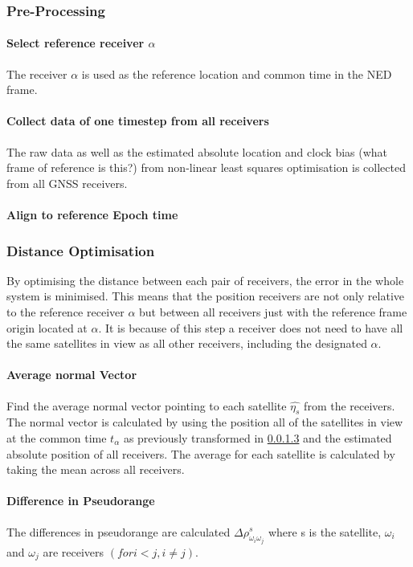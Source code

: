 \subsubsection{Pre-Processing}
\paragraph{Select reference receiver $\alpha$}
The receiver $\alpha$ is used as the reference location and common time in the NED frame. 
\paragraph{Collect data of one timestep from all receivers}
The raw data as well as the estimated absolute location and clock bias (what frame of reference is this?) from non-linear least squares optimisation is collected from all GNSS receivers.
\paragraph{Align to reference Epoch time}\label{timetransform}


\subsubsection{Distance Optimisation}
By optimising the distance between each pair of receivers, the error in the whole system is minimised. 
This means that the position receivers are not only relative to the reference receiver $\alpha$ but between all receivers just with the reference frame origin located at $\alpha$. It is because of this step a receiver does not need to have all the same satellites in view as all other receivers, including the designated $\alpha$.


\paragraph{Average normal Vector}
Find the average normal vector pointing to each satellite $\hat{\eta_s}$ from the receivers. The normal vector is calculated by using the position all of the satellites in view at the common time $t_{\alpha}$ as previously transformed in \ref{timetransform} and the estimated absolute position of all receivers. The average for each satellite is calculated by taking the mean across all receivers.

\paragraph{Difference in Pseudorange}
The differences in pseudorange are calculated $\Delta\rho^s_{\omega_i\omega_j}$ where s is the satellite, $\omega_i$ and $\omega_j$ are receivers $(for i<j, i\neq j)$. 

